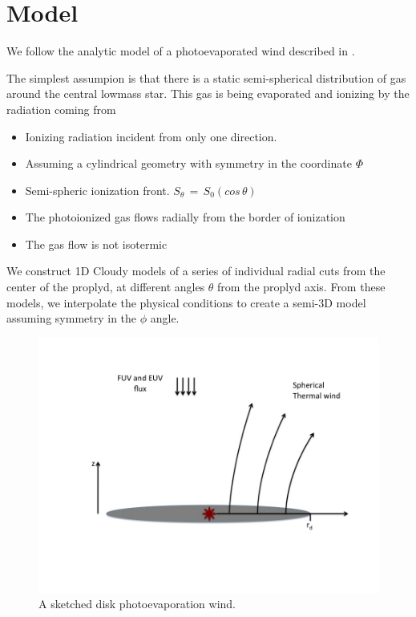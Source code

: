 \documentclass[aaspp]{article}
\begin{document}
\section{Model}
\label{sec:model}

We follow the analytic model of a photoevaporated wind described in \citet{1998AJ....116..322H}.
 
The simplest assumpion is that there is a static semi-spherical distribution of gas around the central lowmass star. This gas is being evaporated and ionizing by the radiation coming from \tc

\begin{itemize}
\item{Ionizing radiation incident from only one direction.}
\item{Assuming a cylindrical geometry with symmetry in the coordinate $\Phi$}
\item{Semi-spheric ionization front. $S_{\theta} \, = \, S_0 (cos \, \theta)$}
\item{The photoionized gas flows radially from the border of ionization}
\item{The gas flow is not isotermic}
\end{itemize}

We construct 1D Cloudy models of a series of individual radial cuts from the center of the proplyd, at different angles $\theta$ from the proplyd axis. From these models, we interpolate the physical conditions to create a semi-3D model assuming symmetry in the $\phi$ angle.

\begin{figure}[h]
\centering
  \includegraphics[width=8.5 cm]{viento.jpg}
  \caption{A sketched disk photoevaporation wind.} \label{fig:wind}
\end{figure}
\end{document}
